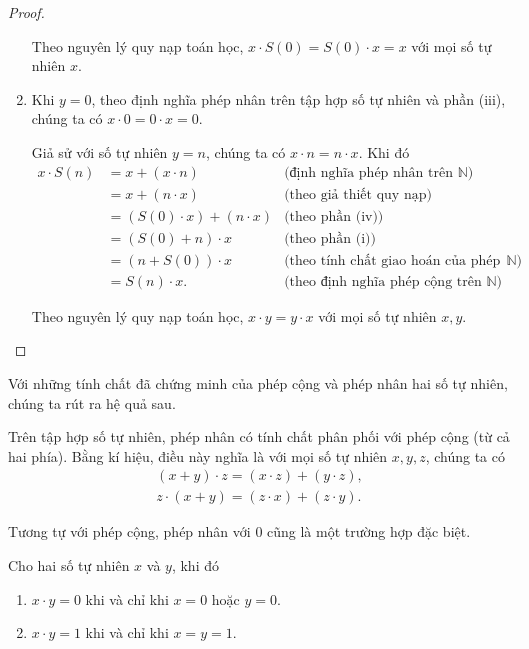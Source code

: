 \begin{proof}
\begin{enumerate}[label={(\roman*)}]
              Theo nguyên lý quy nạp toán học, $x\cdot S(0) = S(0)\cdot x = x$ với mọi số tự nhiên $x$.
        \item Khi $y = 0$, theo định nghĩa phép nhân trên tập hợp số tự nhiên và phần (iii), chúng ta có $x\cdot 0 = 0\cdot x = 0$.

              Giả sử với số tự nhiên $y = n$, chúng ta có $x\cdot n = n\cdot x$. Khi đó
              \begin{align*}
                  x\cdot S(n) & = x + (x\cdot n)             & \text{(định nghĩa phép nhân trên $\mathbb{N}$)}                   \\
                              & = x + (n\cdot x)             & \text{(theo giả thiết quy nạp)}                                   \\
                              & = (S(0)\cdot x) + (n\cdot x) & \text{(theo phần (iv))}                                           \\
                              & = (S(0) + n)\cdot x          & \text{(theo phần (i))}                                            \\
                              & = (n + S(0))\cdot x          & \text{(theo tính chất giao hoán của phép cộng trên $\mathbb{N}$)} \\
                              & = S(n)\cdot x.               & \text{(theo định nghĩa phép cộng trên $\mathbb{N}$)}
              \end{align*}

              Theo nguyên lý quy nạp toán học, $x\cdot y = y\cdot x$ với mọi số tự nhiên $x, y$.
    \end{enumerate}
\end{proof}

Với những tính chất đã chứng minh của phép cộng và phép nhân hai số tự nhiên, chúng ta rút ra hệ quả sau.

\begin{corollary}
    Trên tập hợp số tự nhiên, phép nhân có tính chất phân phối với phép cộng (từ cả hai phía). Bằng kí hiệu, điều này nghĩa là với mọi số tự nhiên $x, y, z$, chúng ta có
    \[
        \begin{split}
            (x + y)\cdot z = (x\cdot z) + (y\cdot z), \\
            z\cdot (x + y) = (z\cdot x) + (z\cdot y).
        \end{split}
    \]
\end{corollary}

Tương tự với phép cộng, phép nhân với $0$ cũng là một trường hợp đặc biệt.
\begin{theorem}\label{theorem:zero-one-and-natural-numbers-multiplication}
    Cho hai số tự nhiên $x$ và $y$, khi đó
    \begin{enumerate}[label={(\roman*)}]
        \item $x\cdot y = 0$ khi và chỉ khi $x = 0$ hoặc $y = 0$.
        \item $x\cdot y = 1$ khi và chỉ khi $x = y = 1$.
    \end{enumerate}
\end{theorem}

